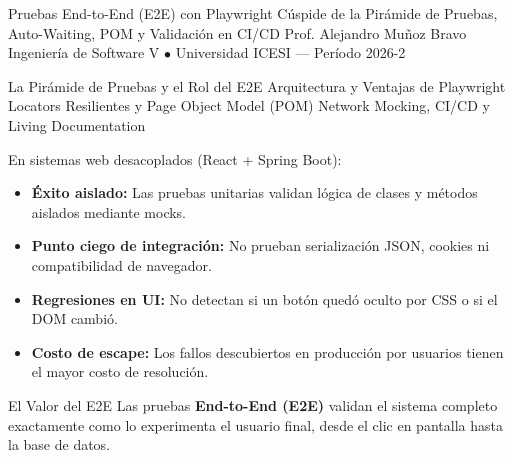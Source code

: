 \documentclass[aspectratio=169]{beamer}
\begin{document}
\titleSlideDarkMode
  {Pruebas End-to-End (E2E) con Playwright}
  {Cúspide de la Pirámide de Pruebas, Auto-Waiting, POM y Validación en CI/CD}
  {Prof. Alejandro Muñoz Bravo}
  {Ingeniería de Software V $\bullet$ Universidad ICESI — Período 2026-2}

  {La Pirámide de Pruebas y el Rol del E2E}
  {Arquitectura y Ventajas de Playwright}
  {Locators Resilientes y Page Object Model (POM)}
  {Network Mocking, CI/CD y Living Documentation}


  {
    {\small
    En sistemas web desacoplados (React + Spring Boot):
    \begin{itemize}
      \item \textbf{Éxito aislado:} Las pruebas unitarias validan lógica de clases y métodos aislados mediante mocks.
      \item \textbf{Punto ciego de integración:} No prueban serialización JSON, cookies ni compatibilidad de navegador.
      \item \textbf{Regresiones en UI:} No detectan si un botón quedó oculto por CSS o si el DOM cambió.
      \item \textbf{Costo de escape:} Los fallos descubiertos en producción por usuarios tienen el mayor costo de resolución.
    \end{itemize}
    }
  }
  {El Valor del E2E}
  {
    Las pruebas \textbf{End-to-End (E2E)} validan el sistema completo exactamente como lo experimenta el usuario final, desde el clic en pantalla hasta la base de datos.
  }
\end{document}
